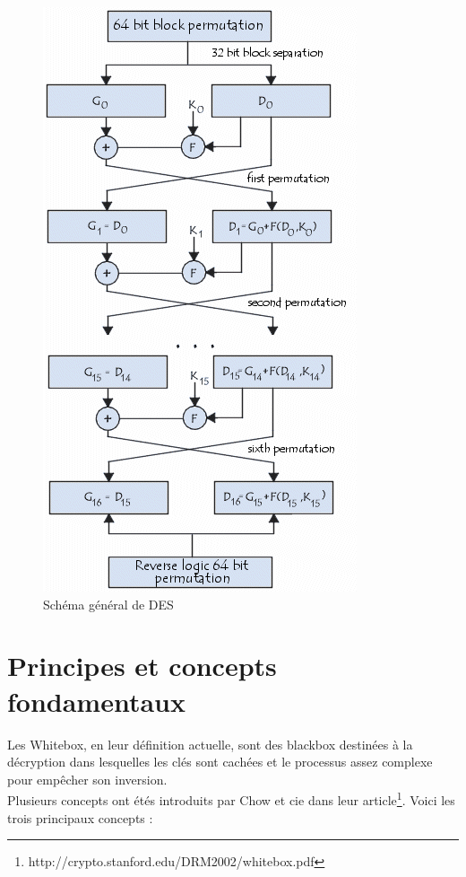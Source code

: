 \documentclass[a4paper,12pt]{article}
\begin{document}
\clearpage

\begin{figure}[h]
\centering
\includegraphics[scale=0.80]{./images/DES_diagram.png}
\caption{Schéma général de DES}
\label{fig:DES-diagram}
\end{figure}

\clearpage

\section{Principes et concepts fondamentaux}

Les Whitebox, en leur définition actuelle, sont des blackbox destinées à la décryption dans lesquelles les clés sont cachées et le processus assez complexe pour empêcher son inversion.\\
Plusieurs concepts ont étés introduits par Chow et cie dans leur article\footnote{http://crypto.stanford.edu/DRM2002/whitebox.pdf}. Voici les trois principaux concepts :
\end{document}
